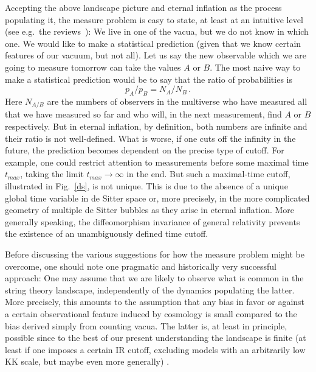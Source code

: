 \documentclass[12pt]{article}
\newcommand{\be}{\begin{equation}}
\newcommand{\ee}{\end{equation}}
\numberwithin{equation}{section}
\begin{document}
Accepting the above landscape picture and eternal inflation as the process populating it, the measure problem is easy to state, at least at an intuitive level (see e.g.~the reviews~\cite{Vilenkin:2006xv ,Freivogel:2011eg, Schellekens:2013bpa}): We live in one of the vacua, but we do not know in which one. We would like to make a statistical prediction (given that we know certain features of our vacuum, but not all). Let us say the new observable which we are going to measure tomorrow can take the values $A$ or $B$. The most naive way to make a statistical prediction would be to say that the ratio of probabilities is
\be
p_A/p_B=N_A/N_B\,.
\ee
Here $N_{A/B}$ are the numbers of observers in the multiverse who have measured all that we have measured so far and who will, in the next measurement, find $A$ or $B$ respectively. But in eternal inflation, by definition, both numbers are infinite and their ratio is not well-defined. What is worse, if one cuts off the infinity in the future, the prediction becomes dependent on the precise type of cutoff. For example, one could restrict attention to measurements before some maximal time $t_{max}$, taking the limit $t_{max}\to \infty$ in the end. But such a maximal-time cutoff, illustrated in Fig.~\ref{ds}, is not unique. This is due to the absence of a unique global time variable in de Sitter space or, more precisely, in the more complicated geometry of multiple de Sitter bubbles as they arise in eternal inflation. More generally speaking, the diffeomorphism invariance of general relativity prevents the existence of an unambiguously defined time cutoff.

Before discussing the various suggestions for how the measure problem might be overcome, one should note one pragmatic and historically very successful approach: One may assume that we are likely to observe what is common in the string theory landscape, independently of the dynamics populating the latter. More precisely, this amounts to the assumption that any bias in favor or against a certain observational feature induced by cosmology is small compared to the bias derived simply from counting vacua. The latter is, at least in principle, possible since to the best of our present understanding the landscape is finite (at least if one imposes a certain IR cutoff, excluding models with an arbitrarily low KK scale, but maybe even more generally) \cite{Acharya:2006zw}.
\end{document}
